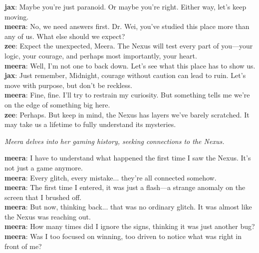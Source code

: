 \documentclass[12pt]{book}
\begin{document}
\textbf{jax}: Maybe you're just paranoid. Or maybe you're right. Either way, let's keep moving.\\

\textbf{meera}: No, we need answers first. Dr. Wei, you've studied this place more than any of us. What else should we expect?\\

\textbf{zee}: Expect the unexpected, Meera. The Nexus will test every part of you—your logic, your courage, and perhaps most importantly, your heart.\\

\textbf{meera}: Well, I'm not one to back down. Let's see what this place has to show us.\\

\textbf{jax}: Just remember, Midnight, courage without caution can lead to ruin. Let's move with purpose, but don't be reckless.\\

\textbf{meera}: Fine, fine. I'll try to restrain my curiosity. But something tells me we're on the edge of something big here.\\

\textbf{zee}: Perhaps. But keep in mind, the Nexus has layers we've barely scratched. It may take us a lifetime to fully understand its mysteries.\\

\vspace{1em}

\textit{Meera delves into her gaming history, seeking connections to the Nexus.}

\textbf{meera}: I have to understand what happened the first time I saw the Nexus. It's not just a game anymore.\\

\textbf{meera}: Every glitch, every mistake... they're all connected somehow.\\

\textbf{meera}: The first time I entered, it was just a flash—a strange anomaly on the screen that I brushed off.\\

\textbf{meera}: But now, thinking back... that was no ordinary glitch. It was almost like the Nexus was reaching out.\\

\textbf{meera}: How many times did I ignore the signs, thinking it was just another bug?\\

\textbf{meera}: Was I too focused on winning, too driven to notice what was right in front of me?\\
\end{document}
